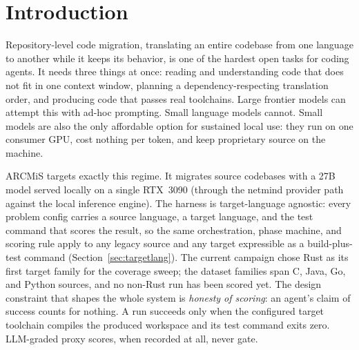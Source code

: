 \documentclass[11pt]{article}
\begin{document}
\section{Introduction}
\label{sec:intro}

Repository-level code migration, translating an entire codebase from
one language to another while it keeps its behavior, is one of the
hardest
open tasks for coding agents. It needs three things at once: reading and
understanding code that does not fit in one context window, planning a
dependency-respecting translation order, and producing code that passes
real toolchains. Large frontier models can attempt this with ad-hoc
prompting. Small language models cannot. Small models are also the only
affordable option for sustained local use: they run on one consumer GPU,
cost nothing per token, and keep proprietary source on the machine.

ARCMiS targets exactly this regime. It migrates source codebases with a
27B model served locally on a single RTX~3090 (through the netmind
provider path against the local inference engine). The harness is
target-language agnostic: every problem config carries a source
language, a target language, and the test command that scores the
result, so the same orchestration, phase machine, and scoring rule apply
to any legacy source and any target expressible as a build-plus-test
command (Section~\ref{sec:targetlang}). The current campaign chose Rust
as its first target family for the coverage sweep; the dataset
families span C, Java, Go, and Python sources, and no non-Rust run has
been scored yet. The design
constraint that shapes the whole system is \emph{honesty of scoring}: an
agent's claim of success counts for nothing. A run succeeds only when the
configured target toolchain compiles the produced workspace and its test
command
exits zero. LLM-graded proxy scores, when recorded at all, never gate.
\end{document}
